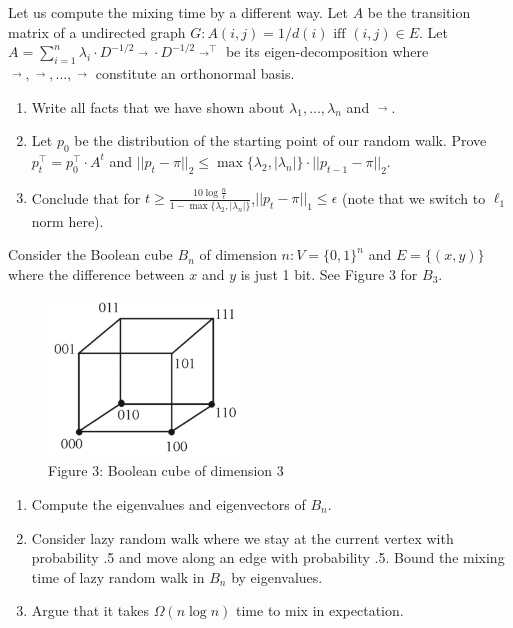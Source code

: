 \begin{problem}[30 points]
\begin{enumerate}
  
\end{enumerate}

\end{problem}

\begin{problem}[40 points] Let us compute the mixing time by a different way. Let $A$ be the transition matrix of a undirected graph $G: A(i, j) = 1/d(i) \text{\ iff\ }(i, j) \in E$. Let $A = \sum_{i=1}^{n}\lambda_i\cdot D^{-1/2}\mathop{v_{i}}\limits ^{\rightarrow}\cdot D^{-1/2}{\mathop{v_{i}}\limits ^{\rightarrow}}^\top$ be its eigen-decomposition where $\mathop{v_{1}}\limits ^{\rightarrow},\mathop{v_{2}}\limits ^{\rightarrow},...,\mathop{v_{n}}\limits ^{\rightarrow}$ constitute an orthonormal basis.
\end{problem}
\begin{enumerate}
	\item Write all facts that we have shown about $\lambda_1,...,\lambda_n$ and $\mathop{u_{1}}\limits^{\rightarrow}$.
	\item Let $p_0$ be the distribution of the starting point of our random walk. Prove $p_t^\top=p_0^\top\cdot A^t$ and $||p_t - \pi||_2 \le \max\{\lambda_2,|\lambda_n|\}\cdot||p_{t-1}-\pi||_2$.
	\item Conclude that for $t\ge\frac{10\log{\frac{n}{\epsilon}}}{1-\max\{\lambda_2,|\lambda_n|\}}$,$||p_t-\pi||_1\le\epsilon$ (note that we switch to $\ell_1$ norm here).
\end{enumerate}

\begin{problem}[30 points] Consider the Boolean cube $B_n$ of dimension $n: V=\{0,1\}^n$ and $E=\{(x,y)\}$ where the difference between $x$ and $y$ is just 1 bit. See Figure 3 for $B_3$.
\end{problem}
\begin{figure}[H]
	\centering
	\includegraphics[width=2in]{images/p2.png}\\
	Figure 3: Boolean cube of dimension 3
\end{figure} 
\begin{enumerate}
	\item Compute the eigenvalues and eigenvectors of $B_n$.
	\item Consider lazy random walk where we stay at the current vertex with probability .5 and move along an edge with probability .5. Bound the mixing time of lazy random walk in	$B_n$ by eigenvalues.
	\item Argue that it takes $\Omega(n\log n)$ time to mix in expectation.
\end{enumerate}

